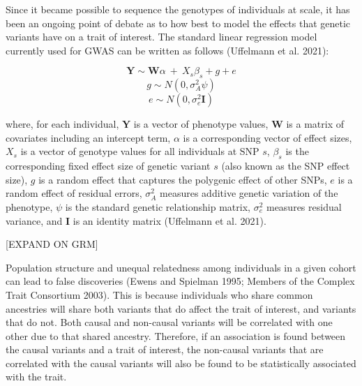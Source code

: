 \documentclass[
]{book}
\begin{document}
Since it became possible to sequence the genotypes of individuals at scale, it has been an ongoing point of debate as to how best to model the effects that genetic variants have on a trait of interest. The standard linear regression model currently used for GWAS can be written as follows (Uffelmann et al. 2021):

\begin{equation}
\textbf{Y} \sim \textbf{W} \alpha ~+~{X_s}{\beta_s} + g + e
\end{equation}
\begin{equation}
g \sim N(0,\sigma^2_A\psi)
\end{equation}
\begin{equation}
e \sim N(0,\sigma^2_e \textbf{I})
\end{equation}

where, for each individual, \(\textbf{Y}\) is a vector of phenotype values, \(\textbf{W}\) is a matrix of covariates including an intercept term, \(\alpha\) is a corresponding vector of effect sizes, \(X_s\) is a vector of genotype values for all individuals at SNP \(s\), \(\beta_s\) is the corresponding fixed effect size of genetic variant \(s\) (also known as the SNP effect size), \(g\) is a random effect that captures the polygenic effect of other SNPs, \(e\) is a random effect of residual errors, \(\sigma^2_{A}\) measures additive genetic variation of the phenotype, \(\psi\) is the standard genetic relationship matrix, \(\sigma^2_e\) measures residual variance, and \(\textbf{I}\) is an identity matrix (Uffelmann et al. 2021).

{[}EXPAND ON GRM{]}

Population structure and unequal relatedness among individuals in a given cohort can lead to false discoveries (Ewens and Spielman 1995; Members of the Complex Trait Consortium 2003). This is because individuals who share common ancestries will share both variants that do affect the trait of interest, and variants that do not. Both causal and non-causal variants will be correlated with one other due to that shared ancestry. Therefore, if an association is found between the causal variants and a trait of interest, the non-causal variants that are correlated with the causal variants will also be found to be statistically associated with the trait.
\end{document}
